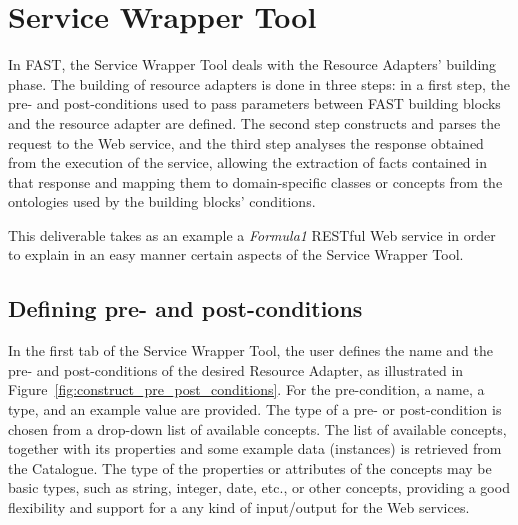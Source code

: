 \documentclass{fast_latex}
\begin{document}



\clearpage
\section{Service Wrapper Tool} %
\label{sec:restful_web_services_wrapper_tool}

In FAST, the Service Wrapper Tool deals with the Resource Adapters' building phase. The building of resource adapters is done in three steps: in a first step, the pre- and post-conditions used to pass parameters between FAST building blocks and the resource adapter are defined. The second step constructs and parses the request to the Web service, and the third step analyses the response obtained from the execution of the service, allowing the extraction of facts contained in that response and mapping them to domain-specific classes or concepts from the ontologies used by the building blocks' conditions.

This deliverable takes as an example a \emph{Formula1} RESTful Web service in order to explain in an easy manner certain aspects of the Service Wrapper Tool.

\subsection{Defining pre- and post-conditions} %
\label{sub:resource_adapter_parameters}

In the first tab of the Service Wrapper Tool, the user defines the name and the pre- and post-conditions of the desired Resource Adapter, as illustrated in Figure~\ref{fig:construct_pre_post_conditions}. For the pre-condition, a name, a type, and an example value are provided. The type of a pre- or post-condition is chosen from a drop-down list of available concepts. The list of available concepts, together with its properties and some example data (instances) is retrieved from the Catalogue. The type of the properties or attributes of the concepts may be basic types, such as string, integer, date, etc., or other concepts, providing a good flexibility and support for a any kind of input/output for the Web services.
\end{document}
